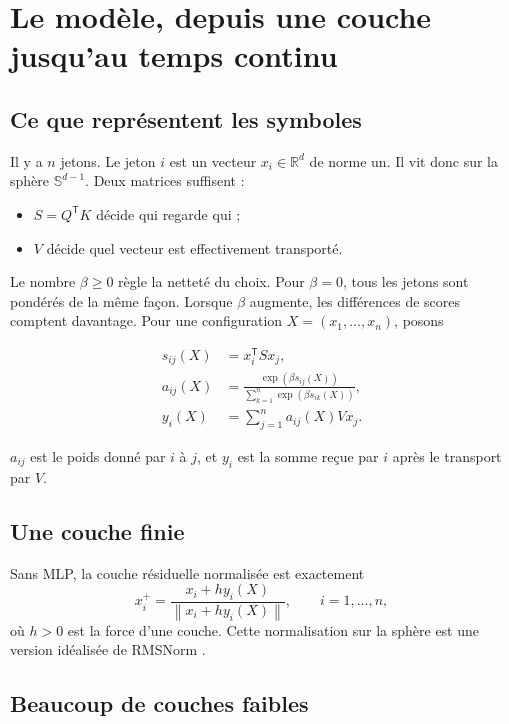 \documentclass[11pt,a4paper]{article}
\theoremstyle{definition}
\newcommand{\sphere}{\mathbb S}
\newcommand{\R}{\mathbb R}
\newcommand{\T}{\mathsf T}
\newcommand{\norm}[1]{\left\lVert #1\right\rVert}
\begin{document}
\section{Le modèle, depuis une couche jusqu'au temps continu}
\label{sec:model}

\subsection{Ce que représentent les symboles}

Il y a $n$ jetons. Le jeton $i$ est un vecteur $x_i\in\R^d$ de norme un. Il vit donc sur
la sphère $\sphere^{d-1}$. Deux matrices suffisent :

\begin{itemize}
  \item $S=Q^{\T}K$ décide qui regarde qui ;
  \item $V$ décide quel vecteur est effectivement transporté.
\end{itemize}

Le nombre $\beta\geq0$ règle la netteté du choix. Pour $\beta=0$, tous les jetons sont
pondérés de la même façon. Lorsque $\beta$ augmente, les différences de scores comptent
davantage. Pour une configuration $X=(x_1,\ldots,x_n)$, posons

\begin{align}
 s_{ij}(X)&=x_i^{\T}Sx_j,\\
 a_{ij}(X)&=\frac{\exp(\beta s_{ij}(X))}
 {\sum_{k=1}^n\exp(\beta s_{ik}(X))},\\
 y_i(X)&=\sum_{j=1}^n a_{ij}(X)Vx_j. \label{eq:attention-output}
\end{align}

$a_{ij}$ est le poids donné par $i$ à $j$, et $y_i$ est la somme reçue par $i$ après le
transport par $V$.

\subsection{Une couche finie}

Sans MLP, la couche résiduelle normalisée est exactement
\begin{equation}
 x_i^+=\frac{x_i+h y_i(X)}{\norm{x_i+h y_i(X)}} ,
 \qquad i=1,\ldots,n,                                      \label{eq:finite-map}
\end{equation}
où $h>0$ est la force d'une couche. Cette normalisation sur la sphère est une version
idéalisée de RMSNorm \cite{zhang2019rmsnorm}.

\subsection{Beaucoup de couches faibles}
\end{document}
